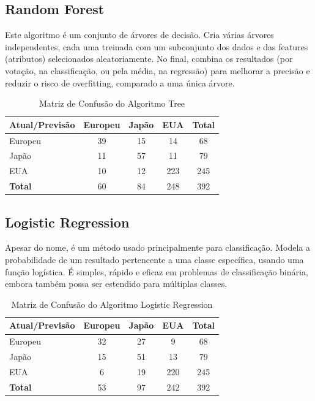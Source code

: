 \documentclass[conference]{IEEEtran}
\begin{document}
\subsection{Random Forest}
Este algoritmo é um conjunto de árvores de decisão. Cria várias árvores independentes, cada uma treinada com 
um subconjunto dos dados e das features (atributos) selecionados aleatoriamente. No final, combina os resultados 
(por votação, na classificação, ou pela média, na regressão) para melhorar a precisão e reduzir o risco de overfitting, 
comparado a uma única árvore.

\begin{table}[h!]
    \centering
    \caption{Matriz de Confusão do Algoritmo Tree}
    \begin{tabular}{lcccc}
    \toprule
    \textbf{Atual/Previsão} & \textbf{Europeu} & \textbf{Japão} & \textbf{EUA} & \textbf{Total} \\
    \midrule
    Europeu & 39 & 15 & 14 & 68 \\
    Japão  & 11 & 57 & 11 & 79 \\
    EUA    & 10 & 12 & 223 & 245 \\
    \midrule
    \textbf{Total} & 60 & 84 & 248 & 392 \\
    \bottomrule
    \end{tabular}
    \label{tab:conf_matrix}
\end{table}

\subsection{Logistic Regression}
Apesar do nome, é um método usado principalmente para classificação. Modela a probabilidade de um resultado pertencente a 
uma classe específica, usando uma função logística. É simples, rápido e eficaz em problemas de classificação binária, 
embora também possa ser estendido para múltiplas classes.
\begin{table}[h!]
    \centering
    \caption{Matriz de Confusão do Algoritmo Logistic Regression}
    \begin{tabular}{lcccc}
    \toprule
    \textbf{Atual/Previsão} & \textbf{Europeu} & \textbf{Japão} & \textbf{EUA} & \textbf{Total} \\
    \midrule
    Europeu & 32 & 27 & 9 & 68 \\
    Japão  & 15 & 51 & 13 & 79 \\
    EUA    & 6 & 19 & 220 & 245 \\
    \midrule
    \textbf{Total} & 53 & 97 & 242 & 392 \\
    \bottomrule
    \end{tabular}
    \label{tab:conf_matrix}
\end{table}
\end{document}
